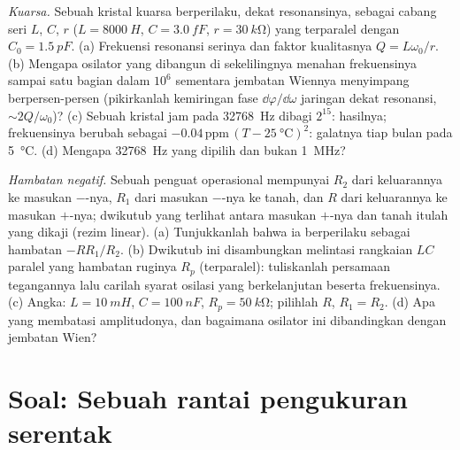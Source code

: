 \begin{exercise}[$\star\star\star$]\label{exo:b2:feedback-oscillators:11}
\emph{Kuarsa.} Sebuah kristal kuarsa berperilaku, dekat resonansinya, sebagai
cabang seri $L$, $C$, $r$ ($L = \qty{8000}{H}$, $C = \qty{3.0}{fF}$, $r =
\qty{30}{k\ohm}$) yang terparalel dengan $C_0 = \qty{1.5}{pF}$. (a) Frekuensi resonansi
serinya dan faktor kualitasnya $Q = L\omega_0/r$. (b) Mengapa osilator
yang dibangun di sekelilingnya menahan frekuensinya sampai satu bagian dalam $10^6$ sementara jembatan
Wiennya menyimpang berpersen-persen (pikirkanlah kemiringan fase $\dd\varphi/\dd\omega$
jaringan  dekat resonansi, $\sim 2Q/\omega_0$)? (c) Sebuah kristal jam
pada \qty{32768}{Hz} dibagi $2^{15}$: hasilnya; frekuensinya
berubah sebagai $-0.04\,\text{ppm}\,(T - \qty{25}{\degreeCelsius})^2$: galatnya tiap
bulan pada \qty{5}{\degreeCelsius}. (d) Mengapa \qty{32768}{Hz} yang dipilih dan bukan
\qty{1}{MHz}?
\end{exercise}

\begin{exercise}[$\star\star\star$]\label{exo:b2:feedback-oscillators:12}
\emph{Hambatan negatif.} Sebuah penguat operasional mempunyai $R_2$ dari keluarannya ke masukan
$-$-nya, $R_1$ dari masukan $-$-nya ke tanah, dan $R$ dari keluarannya ke masukan $+$-nya;
dwikutub yang terlihat antara masukan $+$-nya dan tanah itulah yang dikaji (rezim
linear). (a) Tunjukkanlah bahwa ia berperilaku sebagai hambatan $-RR_1/R_2$. (b) Dwikutub
ini disambungkan melintasi rangkaian $LC$ paralel yang hambatan ruginya
$R_p$ (terparalel): tuliskanlah persamaan tegangannya lalu carilah
syarat osilasi yang berkelanjutan beserta frekuensinya. (c) Angka: $L
= \qty{10}{mH}$, $C = \qty{100}{nF}$, $R_p = \qty{50}{k\ohm}$; pilihlah $R$, $R_1 =
R_2$. (d) Apa yang membatasi amplitudonya, dan bagaimana osilator ini
dibandingkan dengan jembatan Wien?
\end{exercise}

\section{Soal: Sebuah rantai pengukuran serentak}

